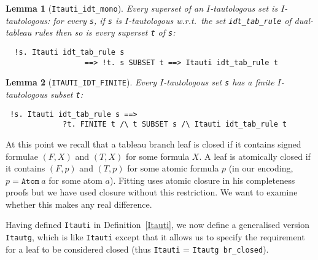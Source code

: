\documentclass[a4paper]{article}
\newtheorem{lemma}{Lemma}
\begin{document}
\begin{lemma}[\texttt{Itauti\_idt\_mono}] \label{Itauti-idt-mono}
  Every superset of an $I$-tautologous set is $I$-tautologous: for every
  \texttt{s}, if \texttt{s} is $I$-tautologous w.r.t.\ the set
  \texttt{idt\_tab\_rule} of dual-tableau rules then so is every
  superset \texttt{t} of \texttt{s}:
\end{lemma}
\begin{verbatim}
  !s. Itauti idt_tab_rule s 
                  ==> !t. s SUBSET t ==> Itauti idt_tab_rule t
\end{verbatim}

\begin{lemma}[\texttt{ITAUTI\_IDT\_FINITE}]\label{ITAUTI-IDT-FINITE}
Every $I$-tautologous set \texttt{s} has
a finite $I$-tautologous subset \texttt{t}:
\end{lemma}
\begin{verbatim}
 !s. Itauti idt_tab_rule s ==>
             ?t. FINITE t /\ t SUBSET s /\ Itauti idt_tab_rule t
\end{verbatim}

At this point we recall that a tableau branch leaf is closed if it contains
signed formulae $(F, X)$ and $(T, X)$ for some formula $X$.
A leaf is atomically closed if it contains $(F, p)$ and $(T, p)$
for some atomic formula $p$ (in our encoding, $p = \texttt{Atom}\ a$ for some
atom $a$).
Fitting \cite[Definition~2]{fitting-dual-tableau} uses atomic closure
in his completeness proofs but
we have used closure without this restriction. We 
want to examine whether this makes any real difference.

Having defined \texttt{Itauti} in Definition~\ref{Itauti},
we now define a generalised version \texttt{Itautg},
which is like \texttt{Itauti} except that it allows us
to specify the requirement for a leaf to be considered closed
(thus \texttt{Itauti} = \texttt{Itautg br\_closed}).
\end{document}
